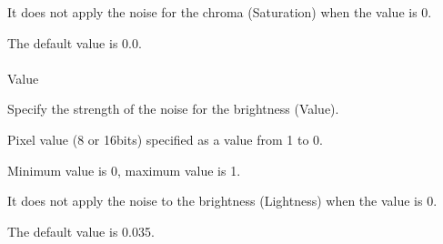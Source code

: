 \documentclass[a4paper,12pt]{article}
\begin{document}
It does not apply the noise for the chroma (Saturation) when the value is 0.\par
The default value is 0.0.\\
\\
Value\par
Specify the strength of the noise for the brightness (Value).\par
Pixel value (8 or 16bits) specified as a value from 1 to 0.\par
Minimum value is 0, maximum value is 1.\par
It does not apply the noise to the brightness (Lightness) when the value is 0.\par
The default value is 0.035.

\newpage

\thispagestyle{empty}
\end{document}
